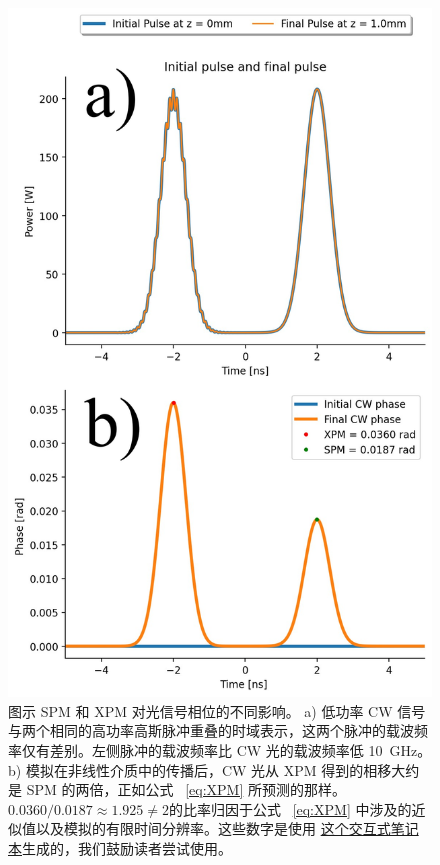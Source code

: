 \begin{figure}
    \centering
    \includegraphics[width=0.8\linewidth]{figures/XPM_combined.png}
    \caption{图示 SPM 和 XPM 对光信号相位的不同影响。 a) 低功率 CW 信号与两个相同的高功率高斯脉冲重叠的时域表示，这两个脉冲的载波频率仅有差别。左侧脉冲的载波频率比 CW 光的载波频率低 10~GHz。 b) 模拟在非线性介质中的传播后，CW 光从 XPM 得到的相移大约是 SPM 的两倍，正如公式 ~\ref{eq:XPM} 所预测的那样。$0.0360/0.0187\approx 1.925\neq2$的比率归因于公式 ~\ref{eq:XPM} 中涉及的近似值以及模拟的有限时间分辨率。这些数字是使用 \href{https://colab.research.google.com/drive/1aIRradfOZGN7JYUhbtYJdVzJwAZoYoUe?usp=sharing}{这个交互式笔记本}生成的，我们鼓励读者尝试使用。}
    \label{fig:XPM}
\end{figure}







